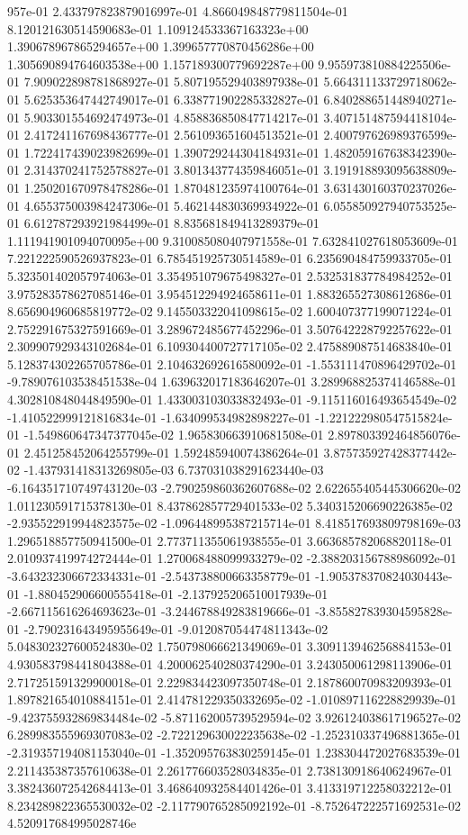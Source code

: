 957e-01	2.433797823879016997e-01	4.866049848779811504e-01	8.120121630514590683e-01	1.109124533367163323e+00	1.390678967865294657e+00	1.399657770870456286e+00	1.305690894764603538e+00	1.157189300779692287e+00	9.955973810884225506e-01	7.909022898781868927e-01	5.807195529403897938e-01	5.664311133729718062e-01	5.625353647442749017e-01	6.338771902285332827e-01	6.840288651448940271e-01	5.903301554692474973e-01	4.858836850847714217e-01	3.407151487594418104e-01	2.417241167698436777e-01	2.561093651604513521e-01	2.400797626989376599e-01	1.722417439023982699e-01	1.390729244304184931e-01	1.482059167638342390e-01	2.314370241752578827e-01	3.801343774359846051e-01	3.191918893095638809e-01	1.250201670978478286e-01	1.870481235974100764e-01	3.631430160370237026e-01	4.655375003984247306e-01	5.462144830369934922e-01	6.055850927940753525e-01	6.612787293921984499e-01	8.835681849413289379e-01	1.111941901094070095e+00	9.310085080407971558e-01	7.632841027618053609e-01	7.221222590526937823e-01	6.785451925730514589e-01	6.235690484759933705e-01	5.323501402057974063e-01	3.354951079675498327e-01	2.532531837784984252e-01	3.975283578627085146e-01	3.954512294924658611e-01	1.883265527308612686e-01	8.656904960685819772e-02	9.145503322041098615e-02	1.600407377199071224e-01	2.752291675327591669e-01	3.289672485677452296e-01	3.507642228792257622e-01	2.309907929343102684e-01	6.109304400727717105e-02	2.475889087514683840e-01	5.128374302265705786e-01	2.104632692616580092e-01	-1.553111470896429702e-01	-9.789076103538451538e-04	1.639632017183646207e-01	3.289968825374146588e-01	4.302810848044849590e-01	1.433003103033832493e-01	-9.115116016493654549e-02	-1.410522999121816834e-01	-1.634099534982898227e-01	-1.221222980547515824e-01	-1.549860647347377045e-02	1.965830663910681508e-01	2.897803392464856076e-01	2.451258452064255799e-01	1.592485940074386264e-01	3.875735927428377442e-02	-1.437931418313269805e-03	6.737031038291623440e-03	-6.164351710749743120e-03	-2.790259860362607688e-02	2.622655405445306620e-02	1.011230591715378130e-01	8.437862857729401533e-02	5.340315206690226385e-02	-2.935522919944823575e-02	-1.096448995387215714e-01	8.418517693809798169e-03	1.296518857750941500e-01	2.773711355061938555e-01	3.663685782068820118e-01	2.010937419974272444e-01	1.270068488099933279e-02	-2.388203156788986092e-01	-3.643232306672334331e-01	-2.543738800663358779e-01	-1.905378370824030443e-01	-1.880452906600555418e-01	-2.137925206510017939e-01	-2.667115616264693623e-01	-3.244678849283819666e-01	-3.855827839304595828e-01	-2.790231643495955649e-01	-9.012087054474811343e-02	5.048302327600524830e-02	1.750798066621349069e-01	3.309113946256884153e-01	4.930583798441804388e-01	4.200062540280374290e-01	3.243050061298113906e-01	2.717251591329900018e-01	2.229834423097350748e-01	2.187860070983209393e-01	1.897821654010884151e-01	2.414781229350332695e-02	-1.010897116228829939e-01	-9.423755932869834484e-02	-5.871162005739529594e-02	3.926124038617196527e-02	6.289983555969307083e-02	-2.722129630022235638e-02	-1.252310337496881365e-01	-2.319357194081153040e-01	-1.352095763830259145e-01	1.238304472027683539e-01	2.211435387357610638e-01	2.261776603528034835e-01	2.738130918640624967e-01	3.382436072542684413e-01	3.468640932584401426e-01	3.413319712258032212e-01	8.234289822365530032e-02	-2.117790765285092192e-01	-8.752647222571692531e-02	4.520917684995028746e